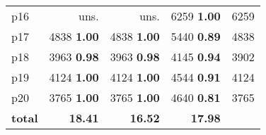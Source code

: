 \begin{tabular}{|l|rrr|r|}
p16 & uns. & uns. & {\footnotesize 6259} \textbf{1.00} & 6259\\
p17 & {\footnotesize 4838} \textbf{1.00} & {\footnotesize 4838} \textbf{1.00} & {\footnotesize 5440} \textbf{0.89} & 4838\\
p18 & {\footnotesize 3963} \textbf{0.98} & {\footnotesize 3963} \textbf{0.98} & {\footnotesize 4145} \textbf{0.94} & 3902\\
p19 & {\footnotesize 4124} \textbf{1.00} & {\footnotesize 4124} \textbf{1.00} & {\footnotesize 4544} \textbf{0.91} & 4124\\
p20 & {\footnotesize 3765} \textbf{1.00} & {\footnotesize 3765} \textbf{1.00} & {\footnotesize 4640} \textbf{0.81} & 3765\\
\hline
\textbf{total} & \textbf{18.41} & \textbf{16.52} & \textbf{17.98} & \\
\hline
\end{tabular}

